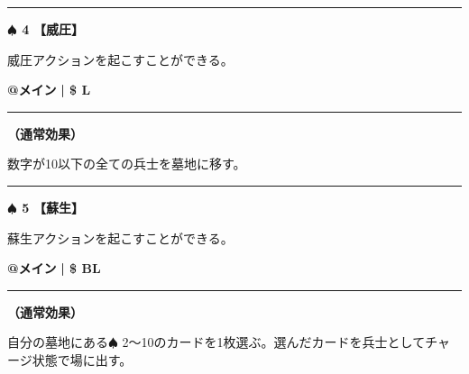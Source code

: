 \documentclass[twocolumn,a5paper,papersize,10pt]{jarticle}
\begin{document}
\vspace{-1zh}

 
 
 
 
 

\vspace{3mm} %
\hrule height 0.5mm depth 0mm width 66.5mm %
\vspace{1mm} %
{\Large\bf $\spadesuit$ 4} {\normalsize\bf【威圧】} %
\vspace{1mm} %

威圧アクションを起こすことができる。

\begin{tcolorbox}[title={\small\bf【Action】威圧}{\scriptsize （通常魔法）}]

{\scriptsize\bf @メイン }
  {\scriptsize\bf | \$ L }

\vspace{1mm} %
\hrule height 0.1mm depth 0mm width 62mm %
\vspace{1mm} %

{\bf（通常効果）}

数字が10以下の全ての兵士を墓地に移す。

\vspace{1mm} %
\end{tcolorbox}

\vspace{-1zh}

 
 
 
 
 

\vspace{3mm} %
\hrule height 0.5mm depth 0mm width 66.5mm %
\vspace{1mm} %
{\Large\bf $\spadesuit$ 5} {\normalsize\bf【蘇生】} %
\vspace{1mm} %

蘇生アクションを起こすことができる。

\begin{tcolorbox}[title={\small\bf【Action】蘇生}{\scriptsize （通常魔法）}]

{\scriptsize\bf @メイン }
  {\scriptsize\bf | \$ BL }

\vspace{1mm} %
\hrule height 0.1mm depth 0mm width 62mm %
\vspace{1mm} %

{\bf（通常効果）}

自分の墓地にある{\normalsize $\spadesuit$} 2〜10のカードを1枚選ぶ。選んだカードを兵士としてチャージ状態で場に出す。

\vspace{1mm} %
\end{tcolorbox}
\end{document}
